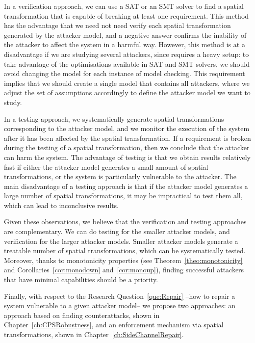 In a verification approach, we can use a SAT or an SMT solver to find a spatial transformation that is capable of breaking at least one requirement. This method has the advantage that we need not need verify each spatial transformation generated by the attacker model, and a negative answer confirms the inability of the attacker to affect the system in a harmful way. However, this method is at a disadvantage if we are studying several attackers, since requires a heavy setup: to take advantage of the optimisations available in SAT and SMT solvers, we should avoid changing the model for each instance of model checking. This requirement implies that we should create a single model that contains all attackers, where we adjust the set of assumptions accordingly to define the attacker model we want to study. 

In a testing approach, we systematically generate spatial transformations corresponding to the attacker model, and we monitor the execution of the system after it has been affected by the spatial transformation. If a requirement is broken during the testing of a spatial transformation, then we conclude that the attacker can harm the system. The advantage of testing is that we obtain results relatively fast if either the attacker model generates a small amount of spatial transformations, or the system is particularly vulnerable to the attacker. The main disadvantage of a testing approach is that if the attacker model generates a large number of spatial transformations, it may be impractical to test them all, which can lead to inconclusive results.

Given these observations, we believe that the verification and testing approaches are complementary. We can do testing for the smaller attacker models, and verification for the larger attacker models. Smaller attacker models generate a treatable number of spatial transformations, which can be systematically tested. Moreover, thanks to monotonicity properties (see Theorem~\ref{theo:monotonicity} and Corollaries~\ref{cor:monodown} and~\ref{cor:monoup}), finding successful attackers that have minimal capabilities should be a priority. %

Finally, with respect to the Research Question~\ref{que:Repair} --how to repair a system vulnerable to a given attacker model-- we propose two approaches: an approach based on finding counterattacks, shown in Chapter~\ref{ch:CPSRobustness}, and an enforcement mechanism via spatial transformations, shown in Chapter~\ref{ch:SideChannelRepair}.

